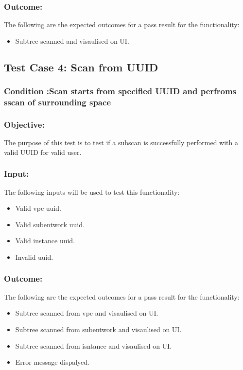 \documentclass[hidelinks,a4paper,12pt]{article}
\begin{document}
\subsubsection{Outcome: }
The following are the expected outcomes for a pass result for the functionality:
\begin{itemize}
\item Subtree scanned and visaulised on UI.
\end{itemize}


\subsection{Test Case 4: Scan from UUID}
\subsubsection{Condition :Scan starts from specified UUID and perfroms sscan of surrounding space}
\subsubsection{Objective:} The purpose of this test is to test if a subscan is successfully performed with a valid UUID for valid user.

\subsubsection{Input:}
 The following inputs will be used to test this functionality:
\begin{itemize}
  \item Valid vpc uuid.
  \item Valid subentwork uuid.
 \item Valid instance uuid.
\item Invalid uuid.

\end{itemize}

\subsubsection{Outcome: }
The following are the expected outcomes for a pass result for the functionality:
\begin{itemize}
\item Subtree scanned from vpc and visaulised on UI.
\item Subtree scanned from subentwork and visaulised on UI.
\item Subtree scanned from isntance and visaulised on UI.
\item Error message dispalyed.
\end{itemize}
\end{document}
